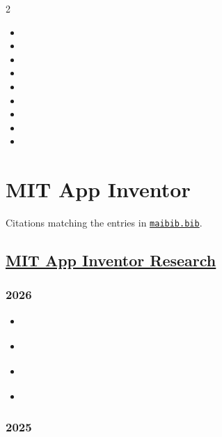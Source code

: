 \begin{multicols}{2}
\begin{itemize}
 \item {}
 \item {}
 \item {}
 \item {}
 \item {}
 \item {}
 \item {}
 \item {}
 \item {}

\end{itemize}

\section{MIT App Inventor}

Citations matching the entries in \texttt{\href{https://github.com/dcpetty/latex/blob/main/bib/maibib.bib}{maibib.bib}}.

\subsection{\href{https://appinventor.mit.edu/explore/research}{MIT App Inventor Research}}

\subsubsection{2026}

\begin{itemize}

 \item \autocite{mai:lee2026google}
 \item \autocite{mai:zamanova2026visual}
 \item \autocite{mai:kim2026futuremakers}
 \item \autocite{mai:afrida2026ai-driven}

\end{itemize}

\subsubsection{2025}

\begin{itemize}


\end{itemize}
\end{multicols}
